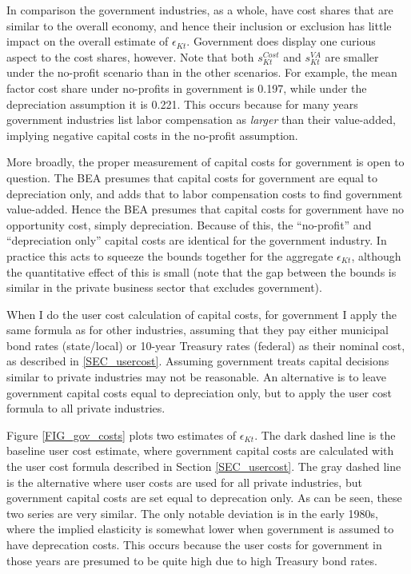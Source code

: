 \documentclass[11pt]{article}
\begin{document}
In comparison the government industries, as a whole, have cost shares that are similar to the overall economy, and hence their inclusion or exclusion has little impact on the overall estimate of $\epsilon_{Kt}$. Government does display one curious aspect to the cost shares, however. Note that both $s_{Kt}^{Cost}$ and $s_{Kt}^{VA}$ are smaller under the no-profit scenario than in the other scenarios. For example, the mean factor cost share under no-profits in government is 0.197, while under the depreciation assumption it is 0.221. This occurs because for many years government industries list labor compensation as \textit{larger} than their value-added, implying negative capital costs in the no-profit assumption. 

More broadly, the proper measurement of capital costs for government is open to question. The BEA presumes that capital costs for government are equal to depreciation only, and adds that to labor compensation costs to find government value-added. Hence the BEA presumes that capital costs for government have no opportunity cost, simply depreciation. Because of this, the ``no-profit'' and ``depreciation only'' capital costs are identical for the government industry. In practice this acts to squeeze the bounds together for the aggregate $\epsilon_{Kt}$, although the quantitative effect of this is small (note that the gap between the bounds is similar in the private business sector that excludes government).

When I do the user cost calculation of capital costs, for government I apply the same formula as for other industries, assuming that they pay either municipal bond rates (state/local) or 10-year Treasury rates (federal) as their nominal cost, as described in \ref{SEC_usercost}. Assuming government treats capital decisions similar to private industries may not be reasonable. An alternative is to leave government capital costs equal to depreciation only, but to apply the user cost formula to all private industries.

Figure \ref{FIG_gov_costs} plots two estimates of $\epsilon_{Kt}$. The dark dashed line is the baseline user cost estimate, where government capital costs are calculated with the user cost formula described in Section \ref{SEC_usercost}. The gray dashed line is the alternative where user costs are used for all private industries, but government capital costs are set equal to deprecation only. As can be seen, these two series are very similar. The only notable deviation is in the early 1980s, where the implied elasticity is somewhat lower when government is assumed to have deprecation costs. This occurs because the user costs for government in those years are presumed to be quite high due to high Treasury bond rates.
\end{document}
